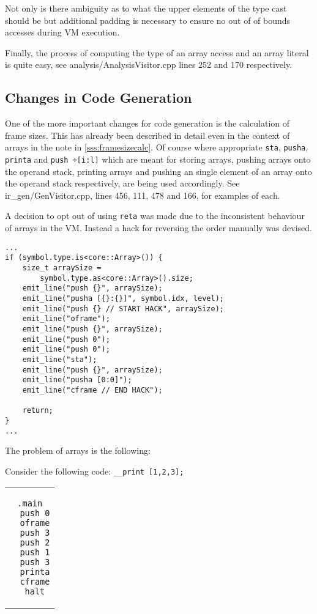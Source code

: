 Not only is there ambiguity as to what the upper elements of the
type cast should be but additional padding is necessary to
ensure no out of of bounds accesses during VM execution.

Finally, the process of computing the type of an array access
and an array literal is quite easy, see
analysis/AnalysisVisitor.cpp lines 252 and 170 respectively.

\subsection{Changes in Code Generation}

One of the more important changes for code generation is the
calculation of frame sizes. This has already been described in
detail even in the context of arrays in the note in
\ref{sss:framesizecalc}. Of course where appropriate
\texttt{sta}, \texttt{pusha}, \texttt{printa} and \texttt{push
+[i:l]} which are meant for storing arrays, pushing arrays onto
the operand stack, printing arrays and pushing an single element
of an array onto the operand stack respectively, are being used
accordingly. See ir\_gen/GenVisitor.cpp, lines 456, 111, 478 and
166, for examples of each.

A decision to opt out of using \texttt{reta} was made due to the
inconsistent behaviour of arrays in the VM. Instead a hack for
reversing the order manually was devised.

\begin{lstlisting}[caption={A part of the \texttt{visit(Variable
*)} method in the \texttt{GenVisitor} class, specifically the
hack mentioned above (ir\_gen/GenVisitor.cpp).},label=lst:hack]
...
if (symbol.type.is<core::Array>()) {
    size_t arraySize =
        symbol.type.as<core::Array>().size;
    emit_line("push {}", arraySize);
    emit_line("pusha [{}:{}]", symbol.idx, level);
    emit_line("push {} // START HACK", arraySize);
    emit_line("oframe");
    emit_line("push {}", arraySize);
    emit_line("push 0");
    emit_line("push 0");
    emit_line("sta");
    emit_line("push {}", arraySize);
    emit_line("pusha [0:0]");
    emit_line("cframe // END HACK");

    return;
}
...
\end{lstlisting}

The problem of arrays is the following:

Consider the following code: \texttt{\_\_print [1,2,3];}

\begin{center}
\begin{tabular}{c}
\begin{lstlisting}[morekeywords={push, printa, oframe, cframe,
halt},frame=none]
  .main
  push 0
  oframe
  push 3
  push 2
  push 1
  push 3
  printa
  cframe
  halt
\end{lstlisting}
\end{tabular}
\end{center}


